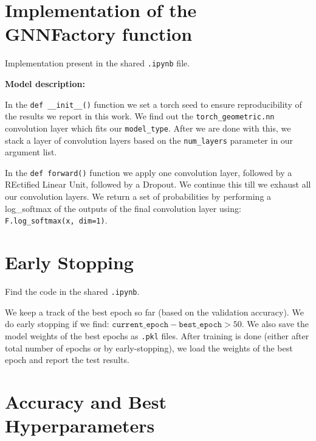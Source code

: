 \documentclass[11pt]{article}
\begin{document}
    \pagebreak
    
    \section{Implementation of the GNNFactory function}
    
    Implementation present in the shared \texttt{.ipynb} file. 
    
    {\large \textbf{Model description: }}
    
    In the \texttt{def __init__()} function we set a torch seed to ensure reproducibility of the results we report in this work. We find out the \texttt{torch_geometric.nn} convolution layer which fits our \texttt{model\_type}. After we are done with this, we stack a layer of convolution layers based on the \texttt{num\_layers} parameter in our argument list.  
    
    In the \texttt{def forward()} function we apply one convolution layer, followed by a REctified Linear Unit, followed by a Dropout. We continue this till we exhaust all our convolution layers. We return a set of probabilities by performing a log\_softmax of the outputs of the final convolution layer using:  \texttt{F.log_softmax(x, dim=1)}.
    
    \section{Early Stopping}
    
    Find the code in the shared \texttt{.ipynb}. 
    
    We keep a track of the best epoch so far (based on the validation accuracy). We do early stopping if we find: $\texttt{current\_epoch} - \texttt{best\_epoch} > 50$. We also save the model weights of the best epochs as \texttt{.pkl} files. After training is done (either after total number of epochs or by early-stopping), we load the weights of the best epoch and report the test results.
    
    
    \section{Accuracy and Best Hyperparameters}
    
\end{document}
